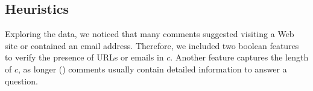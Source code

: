\subsection{Heuristics}
\label{ssub:heuristics}

Exploring the data, we noticed that many \good comments suggested visiting a Web 
site or contained an email address. Therefore, we included two boolean 
features 
to verify the presence of URLs or emails in $c$. Another feature captures the 
length of $c$, as longer (\good) comments usually contain detailed information 
to answer a question. 



% 
% 
% 


% 
% 
% 
% 
% 


